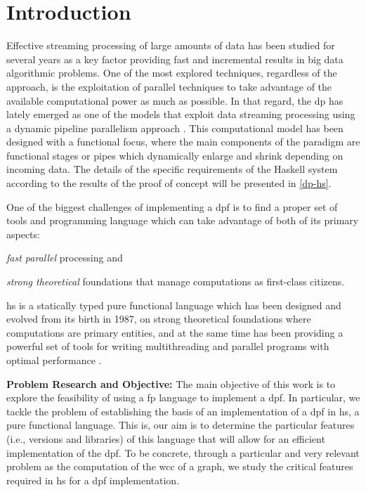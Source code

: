 \section{Introduction}\label{intro}
Effective streaming processing of large amounts of data has been studied for several years \cite{enumeratingsg, exploting, onthefly} as a key factor providing fast and incremental results in big data algorithmic problems. One of the most explored techniques, regardless of the approach, is the exploitation of parallel techniques to take advantage of the available computational power as much as possible. In that regard, the \acrfull{dp} \cite{dpdef} has lately emerged as one of the models that exploit data streaming processing using a dynamic pipeline parallelism approach \cite{onthefly}. This computational model has been designed with a functional focus, where the main components of the paradigm are functional stages or pipes which dynamically enlarge and shrink depending on incoming data.  
The details of the specific requirements of the Haskell system according to the results of the proof of concept will be presented in \autoref{dp-hs}.

One of the biggest challenges of implementing a \acrfull{dpf} is to find a proper set of tools and programming language which can take advantage of both of its primary aspects: \begin{inparaenum}[i\upshape)]
\item  \emph{fast parallel} processing and 
\item  \emph{strong theoretical} foundations that manage computations as first-class citizens.
 \end{inparaenum}
\acrfull{hs} is a statically typed pure functional language which has been designed and evolved from its birth in 1987, on strong theoretical foundations where computations are primary entities, and at the same time has been providing a powerful set of tools for writing multithreading and parallel programs with optimal performance \cite{parallelbook, monadpar}.

\textbf{Problem Research and Objective:}\label{research:obj} The main objective of this work is to explore the feasibility of using a  \acrfull{fp} language to implement a \acrshort{dpf}. In particular, we tackle the problem of establishing the basis of an implementation of a \acrshort{dpf}  in \acrshort{hs}, a pure functional language. This is,  our aim is to determine the particular features (i.e., versions and libraries) of this language that will allow for an efficient implementation of the \acrshort{dpf}. To be concrete, through a particular and very relevant problem as the computation of the \acrfull{wcc} of a graph,  we study the  critical features required  in \acrshort{hs} for a \acrshort{dpf} implementation.

